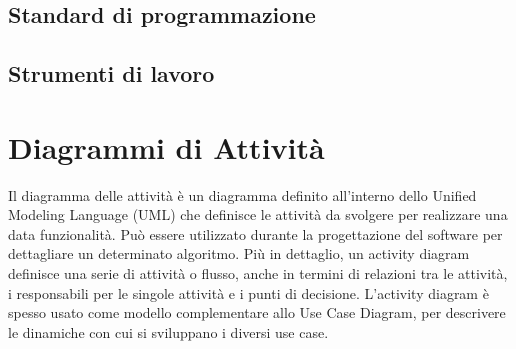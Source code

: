 \subsection{Standard di programmazione}

\subsection{Strumenti di lavoro}


\section{Diagrammi di Attività}
Il diagramma delle attività è un diagramma definito all'interno dello Unified Modeling Language (UML) che definisce le attività da svolgere per realizzare una data funzionalità. Può essere utilizzato durante la progettazione del software per dettagliare un determinato algoritmo. Più in dettaglio, un activity diagram definisce una serie di attività o flusso, anche in termini di relazioni tra le attività, i responsabili per le singole attività e i punti di decisione. L'activity diagram è spesso usato come modello complementare allo Use Case Diagram, per descrivere le dinamiche con cui si sviluppano i diversi use case.

